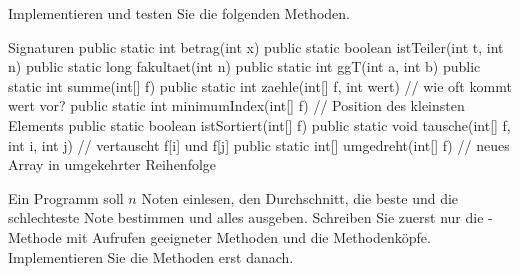 Implementieren und testen Sie die folgenden Methoden.
\begin{javacode}[Ausschnitt]{Signaturen}
public static int betrag(int x)
public static boolean istTeiler(int t, int n)
public static long fakultaet(int n)
public static int ggT(int a, int b)
public static int summe(int[] f)
public static int zaehle(int[] f, int wert)             // wie oft kommt wert vor?
public static int minimumIndex(int[] f)                 // Position des kleinsten Elements
public static boolean istSortiert(int[] f)
public static void tausche(int[] f, int i, int j)       // vertauscht f[i] und f[j]
public static int[] umgedreht(int[] f)                  // neues Array in umgekehrter Reihenfolge
\end{javacode}

Ein Programm soll $n$ Noten einlesen, den Durchschnitt, die beste und die schlechteste Note bestimmen und alles ausgeben. Schreiben Sie zuerst nur die -Methode mit Aufrufen geeigneter Methoden und die Methodenköpfe. Implementieren Sie die Methoden erst danach.
